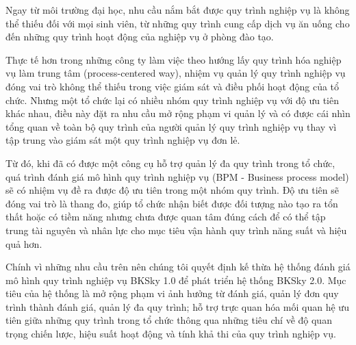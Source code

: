 Ngay từ môi trường đại học, nhu cầu nắm bắt được quy trình nghiệp vụ là không
thể thiếu đối với mọi sinh viên, từ những quy trình cung cấp dịch vụ ăn uống
cho đến những quy trình hoạt động của nghiệp vụ ở phòng đào tạo.

Thực tế hơn trong những công ty làm việc theo hướng lấy quy trình hóa nghiệp vụ
làm trung tâm (process-centered way), nhiệm vụ quản lý quy trình nghiệp vụ đóng
vai trò không thể thiếu trong việc giám sát và điều phối hoạt động của tổ chức.
Nhưng một tổ chức lại có nhiều nhóm quy trình nghiệp vụ với độ ưu tiên khác
nhau, điều này đặt ra nhu cầu mở rộng phạm vi quản lý và có được cái nhìn tổng
quan về toàn bộ quy trình của người quản lý quy trình nghiệp vụ thay vì tập
trung vào giám sát một quy trình nghiệp vụ đơn lẻ.

Từ đó, khi đã có được một công cụ hỗ trợ quản lý đa quy trình trong tổ chức,
quá trình đánh giá mô hình quy trình nghiệp vụ (BPM - Business process model)
sẽ có nhiệm vụ đề ra được độ ưu tiên trong một nhóm quy trình. Độ ưu tiên sẽ
đóng vai trò là thang đo, giúp tổ chức nhận biết được đối tượng nào tạo ra tổn
thất hoặc có tiềm năng nhưng chưa được quan tâm đúng cách để có thể tập trung
tài nguyên và nhân lực cho mục tiêu vận hành quy trình năng suất và hiệu quả
hơn.

Chính vì những nhu cầu trên nên chúng tôi quyết định kế thừa hệ thống đánh giá
mô hình quy trình nghiệp vụ BKSky 1.0 để phát triển hệ thống BKSky 2.0. Mục
tiêu của hệ thống là mở rộng phạm vi ảnh hưởng từ đánh giá, quản lý đơn quy
trình thành đánh giá, quản lý đa quy trình; hỗ trợ trực quan hóa mối quan hệ ưu
tiên giữa những quy trình trong tổ chức thông qua những tiêu chí về độ quan
trọng chiến lược, hiệu suất hoạt động và tính khả thi của quy trình nghiệp vụ.